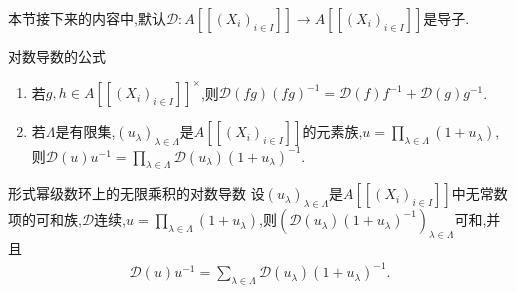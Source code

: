 本节接下来的内容中,默认$\mathcal{D}:A[[(X_{i})_{i\in I}]]\to A[[(X_{i})_{i\in I}]]$是导子.

\begin{proposition}{对数导数的公式}{}
	\begin{enumerate}
		\item 若$g,h\in A[[(X_{i})_{i\in I}]]^{\times}$,则$\mathcal{D}\left(fg\right)\left(fg\right)^{-1}=\mathcal{D}\left(f\right)f^{-1}+\mathcal{D}\left(g\right)g^{-1}$.
		\item 若$\Lambda$是有限集,$\left(u_{\lambda}\right)_{\lambda\in\Lambda}$是$A[[(X_{i})_{i\in I}]]$的元素族,$u=\prod\limits_{\lambda\in\Lambda}\left(1+u_{\lambda}\right)$,则$\mathcal{D}\left(u\right)u^{-1}=\prod\limits_{\lambda\in\Lambda}\mathcal{D}\left(u_{\lambda}\right)\left(1+u_{\lambda}\right)^{-1}$.
	\end{enumerate}
\end{proposition}

\begin{proposition}{形式幂级数环上的无限乘积的对数导数}{}
	设$\left(u_{\lambda}\right)_{\lambda\in\Lambda}$是$A[[(X_{i})_{i\in I}]]$中无常数项的可和族,$\mathcal{D}$连续,$u=\prod\limits_{\lambda\in\Lambda}\left(1+u_{\lambda}\right)$,则$\left(\mathcal{D}\left(u_{\lambda}\right)\left(1+u_{\lambda}\right)^{-1}\right)_{\lambda\in\Lambda}$可和,并且
	\begin{align*}
		\mathcal{D}\left(u\right)u^{-1}=\sum\limits_{\lambda\in\Lambda}\mathcal{D}\left(u_{\lambda}\right)\left(1+u_{\lambda}\right)^{-1}.
	\end{align*}
\end{proposition}


















